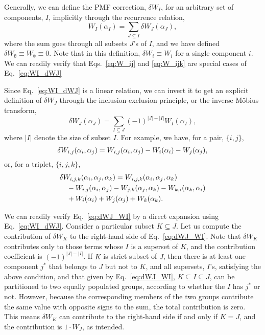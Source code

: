 \documentclass[preprint, superscriptaddress]{revtex4-1}
\begin{document}
Generally, we can define the PMF correction, $\delta W_I$,
for an arbitrary set of components, $I$,
implicitly through the recurrence relation,
%
\begin{equation}
  W_I(\alpha_I)
  =
  \sum_{J \subseteq I}
  \delta W_J(\alpha_J)
  ,
  \label{eq:WI_dWJ}
\end{equation}
%
where the sum goes through all subsets $J$'s of $I$,
and we have defined
$\delta W_\emptyset \equiv W_\emptyset \equiv 0$.
%
Note that in this definition,
$\delta W_i \equiv W_i$
for a single component $i$.
%
We can readily verify that
Eqs.~\eqref{eq:W_ij} and \eqref{eq:W_ijk}
are special cases of Eq.~\eqref{eq:WI_dWJ}

Since Eq.~\eqref{eq:WI_dWJ} is a linear relation,
we can invert it to get an explicit definition of $\delta W_J$
through the inclusion-exclusion principle, or the inverse M\"{o}bius transform\cite{bjorklund2007},
%
\begin{equation}
  \delta W_J(\alpha_J)
  =
  \sum_{I \subseteq J}
  (-1)^{|J| - |I|}
  W_I(\alpha_I)
  ,
  \label{eq:dWJ_WI}
\end{equation}
%
where $|I|$ denote the size of subset $I$.
%
For example, we have, for a pair, $\{i, j\}$,
%
\begin{equation}
  \delta W_{i,j}(\alpha_i, \alpha_j)
  =
  W_{i,j}(\alpha_i, \alpha_j)
  - W_{i}(\alpha_i) - W_{j}(\alpha_j)
  ,
  \notag
\end{equation}
%
or, for a triplet, $\{i, j, k\}$,
%
\begin{align*}
  &\delta W_{i,j,k}(\alpha_i, \alpha_j, \alpha_k)
  =
  W_{i,j,k}(\alpha_i, \alpha_j, \alpha_k)
  \notag\\
  &\quad
  - W_{i,j}(\alpha_i, \alpha_j)
  - W_{j,k}(\alpha_j, \alpha_k)
  - W_{k,i}(\alpha_k, \alpha_i)
  \notag\\
  &\quad
  + W_i(\alpha_i)
  + W_j(\alpha_j)
  + W_k(\alpha_k)
  .
\end{align*}


We can readily verify Eq.~\eqref{eq:dWJ_WI}
by a direct expansion using Eq.~\eqref{eq:WI_dWJ}.
%
Consider a particular subset $K \subseteq J$.
Let us compute the contribution of $\delta W_K$
to the right-hand side of Eq.~\eqref{eq:dWJ_WI}.
%
Note that $\delta W_K$ contributes only to those terms
whose $I$ is a superset of $K$,
and the contribution coefficient is $(-1)^{|J|-|I|}$.
%
If $K$ is strict subset of $J$,
then there is at least one component $j^*$ that belongs to $J$
but not to $K$,
and all supersets, $I$'s,
satisfying the above condition, and that given by Eq.~\eqref{eq:dWJ_WI},
$K \subseteq I \subseteq J$,
can be partitioned to two equally populated groups,
according to whether the $I$ has $j^*$ or not.
%
However, because the corresponding members of the two groups
contribute the same value with opposite signs to the sum,
the total contribution is zero.
%
This means $\delta W_K$ can contribute to the right-hand side
if and only if $K = J$, and the contribution is $1 \cdot W_J$,
as intended.
\end{document}
